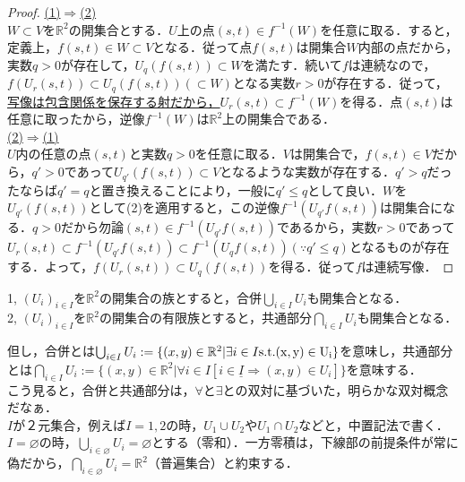 \documentclass[uplatex, 12pt, a4paper, dvipdfmx]{jsarticle}
\begin{document}
\begin{proof}
    \underline{(1)$\Longrightarrow$(2)}\\
    $W\subset V$を$\mathbb{R}^2$の開集合とする．$U$上の点$(s,t)\in f^{-1}(W)$を任意に取る．すると，定義上，$f(s,t)\in W\subset V$となる．従って点$f(s,t)$は開集合$W$内部の点だから，実数$q>0$が存在して，$U_q(f(s,t))\subset W$を満たす．続いて$f$は連続なので，$f(U_r(s,t))\subset U_q(f(s,t))(\subset W)$となる実数$r>0$が存在する．従って，\underline{写像は包含関係を保存する射だから，}$U_r(s,t)\subset f^{-1}(W)$を得る．点$(s,t)$は任意に取ったから，逆像$f^{-1}(W)$は$\mathbb{R}^2$上の開集合である．\\
    \underline{(2)$\Longrightarrow$(1)}\\
    $U$内の任意の点$(s,t)$と実数$q>0$を任意に取る．$V$は開集合で，$f(s,t)\in V$だから，$q'>0$であって$U_{q'}(f(s,t))\subset V$となるような実数が存在する．$q'>q$だったならば$q'=q$と置き換えることにより，一般に$q'\le q$として良い．$W$を$U_{q'}(f(s,t))$として(2)を適用すると，この逆像$f^{-1}(U_{q'}f(s,t))$は開集合になる．$q>0$だから勿論$(s,t)\in f^{-1}(U_{q'}f(s,t))$であるから，実数$r>0$であって$U_r(s,t)\subset f^{-1}(U_{q'}f(s,t)) \subset f^{-1}(U_{q}f(s,t)) (\because q'\le q)$となるものが存在する．よって，$f(U_r(s,t))\subset U_q(f(s,t))$を得る．従って$f$は連続写像．
\end{proof}

\begin{shadebox}\begin{proposition}[Euclid空間の開集合の集合演算に対する性質]\label{proposition1}
    1, $(U_i)_{i\in I}$を$\mathbb{R}^2$の開集合の族とすると，合併$\bigcup_{i\in I}U_i$も開集合となる．\\
    2, $(U_i)_{i\in I}$を$\mathbb{R}^2$の開集合の有限族とすると，共通部分$\bigcap_{i\in I}U_i$も開集合となる．\\
\end{proposition}\end{shadebox}

但し，合併とは$\bigcup_{i\in I}U_i := \{ (x,y)\in\mathbb{R}^2 | \exists i\in I \rm{s.t.} (x,y)\in U_i \}$を意味し，共通部分とは$\bigcap_{i\in I}U_i := \{ (x,y)\in\mathbb{R}^2 | \forall i\in I [\underline{i\in I \Longrightarrow} (x,y)\in U_i ]\}$を意味する．\\
こう見ると，合併と共通部分は，$\forall と \exists$との双対に基づいた，明らかな双対概念だなぁ．\\
$I$が２元集合，例えば$I={1,2}$の時，$U_1 \cup U_2$や$U_1 \cap U_2$などと，中置記法で書く．$I=\varnothing$の時，$\bigcup_{i\in\varnothing}U_i = \varnothing$とする（零和）．一方零積は，下線部の前提条件が常に偽だから，$\bigcap_{i\in\varnothing}U_i = \mathbb{R}^2$（普遍集合）と約束する．\\
\end{document}
